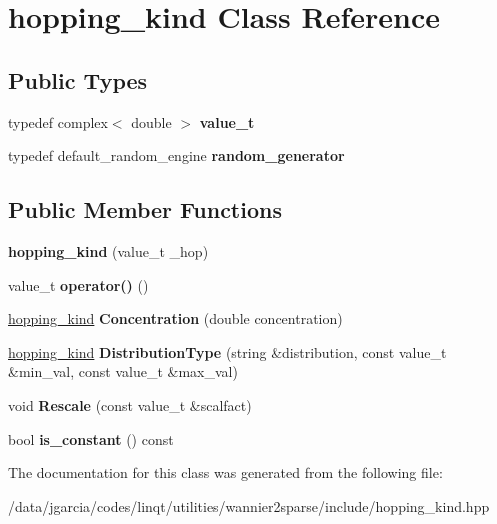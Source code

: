 \hypertarget{classhopping__kind}{}\section{hopping\+\_\+kind Class Reference}
\label{classhopping__kind}
\subsection*{Public Types}
\begin{DoxyCompactItemize}
\item 
typedef complex$<$ double $>$ {\bfseries value\+\_\+t}\hypertarget{classhopping__kind_ade6db5b12bf7dad2bd590283e955be31}{}\label{classhopping__kind_ade6db5b12bf7dad2bd590283e955be31}

\item 
typedef default\+\_\+random\+\_\+engine {\bfseries random\+\_\+generator}\hypertarget{classhopping__kind_a08b2df934be57ad9fa7aee520bdd3341}{}\label{classhopping__kind_a08b2df934be57ad9fa7aee520bdd3341}

\end{DoxyCompactItemize}
\subsection*{Public Member Functions}
\begin{DoxyCompactItemize}
\item 
{\bfseries hopping\+\_\+kind} (value\+\_\+t \+\_\+hop)\hypertarget{classhopping__kind_ab16319e7f52d80a89ae2e0a46051259a}{}\label{classhopping__kind_ab16319e7f52d80a89ae2e0a46051259a}

\item 
value\+\_\+t {\bfseries operator()} ()\hypertarget{classhopping__kind_a7b895a4fe5b6b57c163bf11d46e182af}{}\label{classhopping__kind_a7b895a4fe5b6b57c163bf11d46e182af}

\item 
\hyperlink{classhopping__kind}{hopping\+\_\+kind} {\bfseries Concentration} (double concentration)\hypertarget{classhopping__kind_a9e53733315f2d6d98771e46e6e7a1152}{}\label{classhopping__kind_a9e53733315f2d6d98771e46e6e7a1152}

\item 
\hyperlink{classhopping__kind}{hopping\+\_\+kind} {\bfseries Distribution\+Type} (string \&distribution, const value\+\_\+t \&min\+\_\+val, const value\+\_\+t \&max\+\_\+val)\hypertarget{classhopping__kind_a799eb93b41c08eaffdb776b2d76e3925}{}\label{classhopping__kind_a799eb93b41c08eaffdb776b2d76e3925}

\item 
void {\bfseries Rescale} (const value\+\_\+t \&scalfact)\hypertarget{classhopping__kind_a95dd8a4b29d2706bb4b4abe41aef1a59}{}\label{classhopping__kind_a95dd8a4b29d2706bb4b4abe41aef1a59}

\item 
bool {\bfseries is\+\_\+constant} () const \hypertarget{classhopping__kind_a78367703ba07a91fc340ae19d5a9e69d}{}\label{classhopping__kind_a78367703ba07a91fc340ae19d5a9e69d}

\end{DoxyCompactItemize}


The documentation for this class was generated from the following file\+:\begin{DoxyCompactItemize}
\item 
/data/jgarcia/codes/linqt/utilities/wannier2sparse/include/hopping\+\_\+kind.\+hpp\end{DoxyCompactItemize}
